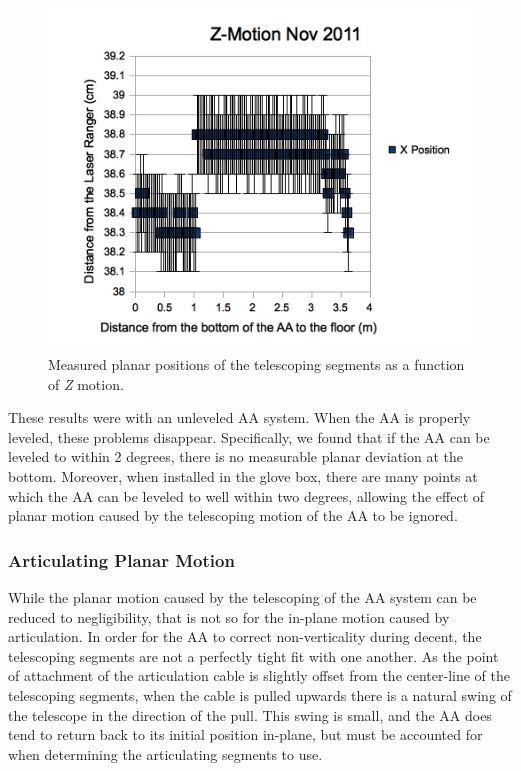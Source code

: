   \begin{figure}
  \includegraphics[width=\textwidth]{AA/Z_Motion_11_11.jpg}
  \caption{Measured planar positions of the telescoping segments as a function of \emph{Z} motion.}
  \label{Telescoping_Planar}
  \end{figure}
  
 These results were with an unleveled AA system. When the AA is properly leveled, these problems disappear. Specifically, we found that if the AA can be leveled to within 2 degrees, there is no measurable planar deviation at the bottom. Moreover, when installed in the glove box, there are many points at which the AA can be leveled to well within two degrees, allowing the effect of planar motion caused by the telescoping motion of the AA to be ignored.  
  
  \subsubsection{Articulating Planar Motion}
  While the planar motion caused by the telescoping of the AA system can be reduced to negligibility, that is not so for the in-plane motion caused by articulation. In order for the AA to correct non-verticality during decent, the telescoping segments are not a perfectly tight fit with one another. As the point of attachment of the articulation cable is slightly offset from the center-line of the telescoping segments, when the cable is pulled upwards there is a natural swing of the telescope in the direction of the pull. This swing is small, and the AA does tend to return back to its initial position in-plane, but must be accounted for when determining the articulating segments to use. 
  
